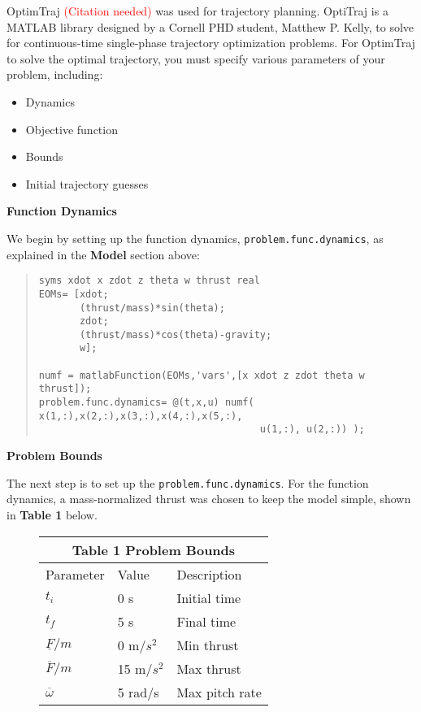 \documentclass[12pt]{article}
\begin{document}
OptimTraj \textcolor{red}{(Citation needed)} was used for trajectory planning. OptiTraj is a MATLAB library designed by a Cornell PHD student, Matthew P. Kelly, to solve for continuous-time single-phase trajectory optimization problems. For OptimTraj to solve the optimal trajectory, you must specify various parameters of your problem, including:
\begin{itemize}
  \item Dynamics
  \item Objective function
  \item Bounds
  \item Initial trajectory guesses
\end{itemize}

\begin{flushleft}
{\Large \textbf{\textbf{Function Dynamics}} }
\end{flushleft}
We begin by setting up the function dynamics, \lstinline!problem.func.dynamics!, as explained in the \textbf{Model} section above: 
\begin{quote}
\begin{lstlisting}
syms xdot x zdot z theta w thrust real
EOMs= [xdot;
       (thrust/mass)*sin(theta);
       zdot;
       (thrust/mass)*cos(theta)-gravity;
       w];

numf = matlabFunction(EOMs,'vars',[x xdot z zdot theta w thrust]);
problem.func.dynamics= @(t,x,u) numf( x(1,:),x(2,:),x(3,:),x(4,:),x(5,:),
                                      u(1,:), u(2,:)) );

\end{lstlisting}
\end{quote}

\begin{flushleft}
{\Large \textbf{\textbf{Problem Bounds}} }
\end{flushleft}

The next step is to set up the \lstinline!problem.func.dynamics!. For the function dynamics, a mass-normalized thrust was chosen to keep the model simple, shown in \textbf{Table 1} below. 

\begin{figure}[H]
\begin{center}
\begin{tabular}{ |p{2.5cm}||p{2cm}|p{3cm}| }
 \hline
 \multicolumn{3}{|c|}{\textbf{Table 1}   Problem Bounds} \\
 \hline
 Parameter & Value & Description\\
 \hline
 $t_{i}$   & 0 s  & Initial time\\
 $t_{f}$  & 5 s  & Final time\\
 $\underline{F}/m$ & 0 m/$s^{2}$ & Min thrust\\
 $\overline{F}/m$ & 15 m/$s^{2}$ & Max thrust\\
 $\overline{\omega}$ & 5 rad/s & Max pitch rate \\
 \hline
\end{tabular}
\end{center}
\end{figure}
\end{document}
